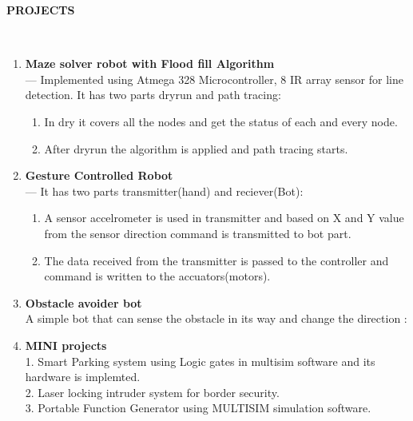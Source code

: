 \documentclass[a4paper,10pt]{article}
\newcommand{\lsep}{-0.5cm}
\newcommand{\resheading}[1]{{\small \colorbox{mygrey}{\begin{minipage}{0.975\textwidth}{\textbf{#1 \vphantom{p\^{E}}}}\end{minipage}}}}
\begin{document}
\resheading{\textbf{PROJECTS} }\\[\lsep]
\begin{enumerate}
\item \noindent \textbf{Maze solver robot with Flood fill Algorithm}\\
\indent --- Implemented using Atmega 328 Microcontroller, 8 IR array sensor for line detection. It has two parts dryrun and path tracing:
\begin{enumerate}
\item In dry it covers all the nodes and get the status of each and every node.
\item  After dryrun the algorithm is applied and path tracing starts.
\end{enumerate} 

\item\noindent\textbf{Gesture Controlled Robot}\\
\indent --- It has two parts transmitter(hand) and reciever(Bot):
\begin{enumerate}
\item  A sensor accelrometer is used in transmitter and based on X and Y value from the sensor direction command is transmitted to bot part.
\item The data received from the transmitter is passed to the controller and command is written to the accuators(motors).
\end{enumerate}

\item\noindent\textbf{Obstacle avoider bot }\\
\indent A simple bot that can sense the obstacle in its way and change the direction :


\item\noindent\textbf{MINI projects}\\
1. Smart Parking system using Logic gates in multisim software and its hardware is implemted.\\
2. Laser locking intruder system for border security.\\
3. Portable Function Generator using MULTISIM simulation software.
\end{enumerate}
\end{document}
